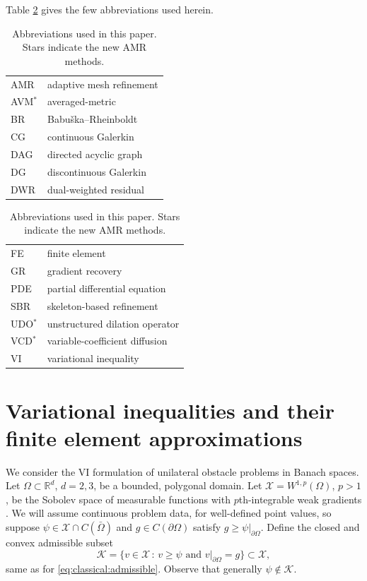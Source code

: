 \documentclass[]{interact}
\theoremstyle{plain}%
\theoremstyle{definition}
\theoremstyle{remark}
\newcommand{\RR}{\mathbb{R}}
\newcommand{\cK}{\mathcal{K}}
\newcommand{\cX}{\mathcal{X}}
\begin{document}
Table \ref{tab:abbrev} gives the few abbreviations used herein.

\begin{table}[ht]
\centering
\begin{minipage}[t]{0.45\textwidth}
\vspace{0pt}
{\small
\begin{tabular}{ll} \\
AMR       & adaptive mesh refinement \\
AVM$^*$   & averaged-metric \\
BR        & Babu\v{s}ka--Rheinboldt \\
CG        & continuous Galerkin \\
DAG       & directed acyclic graph \\
DG        & discontinuous Galerkin \\
DWR       & dual-weighted residual
\end{tabular}
}
\end{minipage}
\quad
\begin{minipage}[t]{0.45\textwidth}
\vspace{0pt}
{\small
\begin{tabular}{ll} \\
FE        & finite element \\
GR        & gradient recovery \\
PDE       & partial differential equation \\
SBR       & skeleton-based refinement \\
UDO$^*$   & unstructured dilation operator \\
VCD$^*$   & variable-coefficient diffusion \\
VI        & variational inequality
\end{tabular}
}
\end{minipage}
\caption{Abbreviations used in this paper.  Stars indicate the new AMR methods.}
\label{tab:abbrev}
\end{table}


\section{Variational inequalities and their finite element approximations} \label{sec:vifem}

We consider the VI formulation of unilateral obstacle problems in Banach spaces.  Let $\Omega \subset \RR^d$, $d=2,3$, be a bounded, polygonal domain.  Let $\cX = W^{1,p}(\Omega)$, $p>1$, be the Sobolev space of measurable functions with $p$th-integrable weak gradients \cite{Evans2010}.  We will assume continuous problem data, for well-defined point values, so suppose $\psi \in \cX \cap C(\bar\Omega)$ and $g\in C(\partial \Omega)$ satisfy $g \ge \psi|_{\partial\Omega}$.  Define the closed and convex admissible subset
\begin{equation} \label{eq:admissible}
\cK = \{v \in \cX \,:\, v \ge \psi \text{ and } v|_{\partial \Omega} = g\} \subset \cX,
\end{equation}
same as for \eqref{eq:classical:admissible}.  Observe that generally $\psi\notin\cK$.
\end{document}
